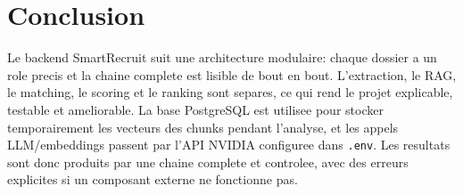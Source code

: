 \documentclass[12pt,a4paper]{article}
\begin{document}
\section{Conclusion}

Le backend SmartRecruit suit une architecture modulaire: chaque dossier a un role precis et la chaine complete est lisible de bout en bout. L'extraction, le RAG, le matching, le scoring et le ranking sont separes, ce qui rend le projet explicable, testable et ameliorable. La base PostgreSQL est utilisee pour stocker temporairement les vecteurs des chunks pendant l'analyse, et les appels LLM/embeddings passent par l'API NVIDIA configuree dans \texttt{.env}. Les resultats sont donc produits par une chaine complete et controlee, avec des erreurs explicites si un composant externe ne fonctionne pas.
\end{document}
